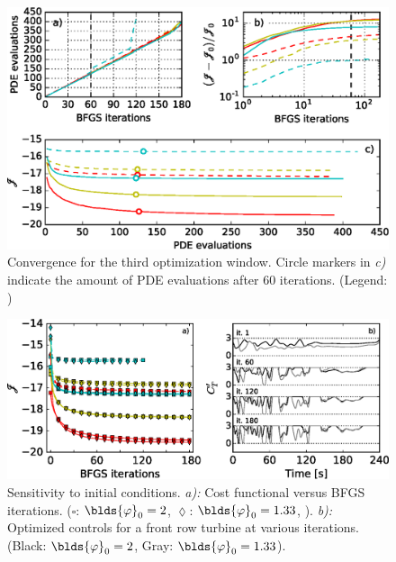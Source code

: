 \begin{figure}[t]
	\centering
	\includegraphics[width=\linewidth]{chapters/philtrans_torque/figure11.eps}
	\caption[Convergence behavior for the third optimization window.]{Convergence for the third optimization window. Circle markers in \emph{c)} indicate the amount of PDE evaluations after 60 iterations. (Legend: \legendnoref) \label{fig:window_opt}}
\end{figure}
	
\begin{figure}[hb!]
	\centering
	\includegraphics[width=\linewidth]{chapters/philtrans_torque/figure13.eps}	
	\caption[Sensitivity of optimization to initial conditions.]{Sensitivity to initial conditions. \emph{a):} Cost functional versus BFGS iterations. ($\square$: $\blds{\varphi}_0 = 2$, $\lozenge$: $\blds{\varphi}_0 = 1.33$, \legendnoref ). \emph{b):} Optimized controls for a front row turbine at various iterations. (Black: $\blds{\varphi}_0 = 2$, Gray: $\blds{\varphi}_0 = 1.33$). \label{fig:initial_conditions}} 
\end{figure}

